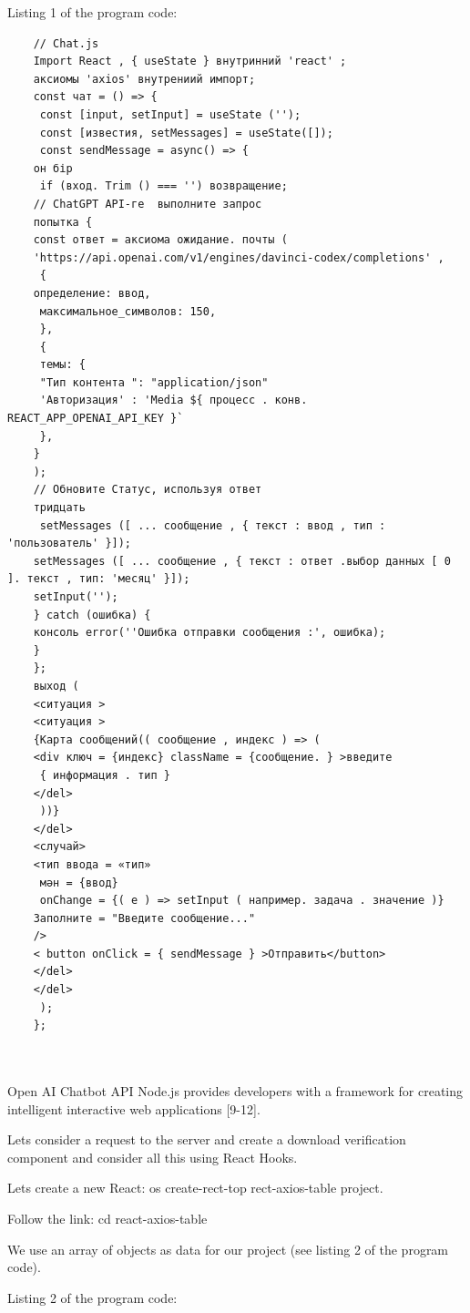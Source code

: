 Listing 1 of the program code:
\begin{verbatim}
	// Chat.js
	Import React , { useState } внутринний 'react' ;
	аксиомы 'axios' внутрениий импорт;
	const чат = () => {
	 const [input, setInput] = useState ('');
	 const [известия, setMessages] = useState([]);
	 const sendMessage = async() => {
	он бір
	 if (вход. Trim () === '') возвращение;
	// ChatGPT API-ге  выполните запрос
	попытка {
	const ответ = аксиома ожидание. почты (
	'https://api.openai.com/v1/engines/davinci-codex/completions' ,
	 {
	определение: ввод,
	 максимальное_символов: 150,
	 },
	 {
	 темы: {
	 "Тип контента ": "application/json"
	 'Авторизация' : 'Media ${ процесс . конв. REACT_APP_OPENAI_API_KEY }` 
	 },
	}
	);
	// Обновите Статус, используя ответ
	тридцать
	 setMessages ([ ... сообщение , { текст : ввод , тип : 'пользователь' }]);
	setMessages ([ ... сообщение , { текст : ответ .выбор данных [ 0 ]. текст , тип: 'месяц' }]);
	setInput('');
	} catch (ошибка) {
	консоль error(''Ошибка отправки сообщения :', ошибка);
	}
	};
	выход (
	<ситуация >
	<ситуация >
	{Карта сообщений(( сообщение , индекс ) => (
	<div ключ = {индекс} className = {сообщение. } >введите
	 { информация . тип }
	</del>
	 ))}
	</del>
	<случай>
	<тип ввода = «тип»
	 мән = {ввод}
	 onChange = {( e ) => setInput ( например. задача . значение )}
	Заполните = "Введите сообщение..."
	/>
	< button onClick = { sendMessage } >Отправить</button>
	</del>
	</del>
	 );
	};
	
	

\end{verbatim}


\begin{multicols}{2}

Open AI Chatbot API Node.js provides developers with a framework for
creating intelligent interactive web applications {[}9-12{]}.

Let\textquotesingle s consider a request to the server and create a
download verification component and consider all this using React Hooks.

Let\textquotesingle s create a new React: os create-rect-top
rect-axios-table project.

Follow the link: cd react-axios-table
\end{multicols}
\begin{multicols}{2}
We use an array of objects as data for our project (see listing 2 of the
program code).

Listing 2 of the program code:

\end{multicols}

